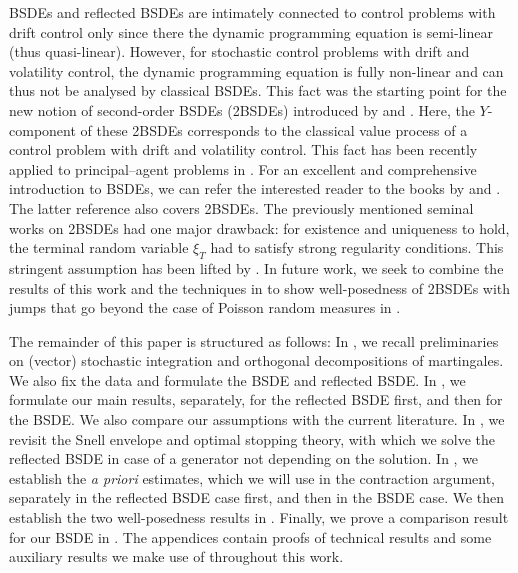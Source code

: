 \documentclass[10pt]{article} %
\begin{document}
\medskip
BSDEs and reflected BSDEs are intimately connected to control problems with drift control only since there the dynamic programming equation is semi-linear (thus quasi-linear). However, for stochastic control problems with drift and volatility control, the dynamic programming equation is fully non-linear and can thus not be analysed by classical BSDEs. This fact was the starting point for the new notion of second-order BSDEs (2BSDEs) introduced by \citeauthor*{cheridito2007second} \cite{cheridito2007second} and \citeauthor*{soner2011quasi} \cite{soner2011quasi,soner2012wellposedness}. Here, the $Y$-component of these 2BSDEs corresponds to the classical value process of a control problem with drift and volatility control. This fact has been recently applied to principal--agent problems in \cite{cvitanic2018dynamic}. For an excellent and comprehensive introduction to BSDEs, we can refer the interested reader to the books by \citeauthor*{touzi2013optimal} \cite{touzi2013optimal} and \citeauthor*{zhang2017backward} \cite{zhang2017backward}. The latter reference also covers 2BSDEs. The previously mentioned seminal works \cite{soner2011quasi,soner2012wellposedness} on 2BSDEs had one major drawback: for existence and uniqueness to hold, the terminal random variable $\xi_T$ had to satisfy strong regularity conditions. This stringent assumption has been lifted by \citeauthor*{possamai2018stochastic} \cite{possamai2018stochastic}. In future work, we seek to combine the results of this work and the techniques in \cite{possamai2018stochastic} to show well-posedness of 2BSDEs with jumps that go beyond the case of Poisson random measures in \citeauthor*{kazi2015second} \cite{kazi2015second,kazi2015second2}.

\medskip
The remainder of this paper is structured as follows: In , we recall preliminaries on (vector) stochastic integration and orthogonal decompositions of martingales. We also fix the data and formulate the BSDE and reflected BSDE. In , we formulate our main results, separately, for the reflected BSDE first, and then for the BSDE. We also compare our assumptions with the current literature. In , we revisit the Snell envelope and optimal stopping theory, with which we solve the reflected BSDE in case of a generator not depending on the solution. In , we establish the \emph{a priori} estimates, which we will use in the contraction argument, separately in the reflected BSDE case first, and then in the BSDE case. We then establish the two well-posedness results in . Finally, we prove a comparison result for our BSDE in . The appendices contain proofs of technical results and some auxiliary results we make use of throughout this work. 
\end{document}

